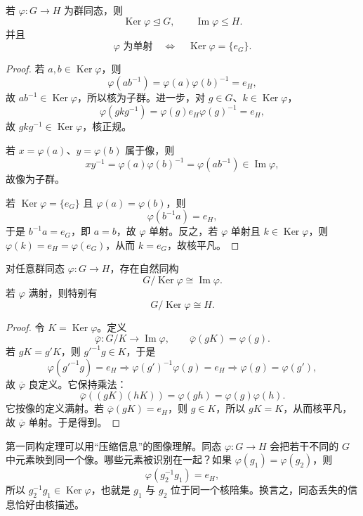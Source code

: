 \begin{theorem}[核与像的结构]
若 $\varphi:G\to H$ 为群同态，则
\[
\operatorname{Ker}\varphi\mathrel{\trianglelefteq} G,
\qquad
\operatorname{Im}\varphi\leqslant H.
\]
并且
\[
\varphi\text{ 为单射}
\quad\Longleftrightarrow\quad
\operatorname{Ker}\varphi=\{e_G\}.
\]
\label{thm:kernel-image}

\end{theorem}

\begin{proof}
若 $a,b\in\operatorname{Ker}\varphi$，则
\[
\varphi(ab^{-1})
=\varphi(a)\varphi(b)^{-1}
=e_H,
\]
故 $ab^{-1}\in\operatorname{Ker}\varphi$，所以核为子群。进一步，对 $g\in G$、$k\in\operatorname{Ker}\varphi$，
\[
\varphi(gkg^{-1})
=\varphi(g)e_H\varphi(g)^{-1}
=e_H,
\]
故 $gkg^{-1}\in\operatorname{Ker}\varphi$，核正规。

若 $x=\varphi(a)$、$y=\varphi(b)$ 属于像，则
\[
xy^{-1}
=\varphi(a)\varphi(b)^{-1}
=\varphi(ab^{-1})\in\operatorname{Im}\varphi,
\]
故像为子群。

若 $\operatorname{Ker}\varphi=\{e_G\}$ 且 $\varphi(a)=\varphi(b)$，则
\[
\varphi(b^{-1}a)=e_H,
\]
于是 $b^{-1}a=e_G$，即 $a=b$，故 $\varphi$ 单射。反之，若 $\varphi$ 单射且 $k\in\operatorname{Ker}\varphi$，则 $\varphi(k)=e_H=\varphi(e_G)$，从而 $k=e_G$，故核平凡。
\end{proof}

\begin{theorem}[第一同构定理]
对任意群同态 $\varphi:G\to H$，存在自然同构
\[
G/\operatorname{Ker}\varphi
\cong
\operatorname{Im}\varphi.
\label{eq:first-isomorphism}
\]
若 $\varphi$ 满射，则特别有
\[
G/\operatorname{Ker}\varphi\cong H.
\]
\label{thm:first-isomorphism}

\end{theorem}

\begin{proof}
令 $K=\operatorname{Ker}\varphi$。定义
\[
\overline{\varphi}:G/K\longrightarrow\operatorname{Im}\varphi,
\qquad
\overline{\varphi}(gK)=\varphi(g).
\]
若 $gK=g'K$，则 $g'^{-1}g\in K$，于是
\[
\varphi(g'^{-1}g)=e_H
\Longrightarrow
\varphi(g')^{-1}\varphi(g)=e_H
\Longrightarrow
\varphi(g)=\varphi(g'),
\]
故 $\overline{\varphi}$ 良定义。它保持乘法：
\[
\overline{\varphi}((gK)(hK))
=\varphi(gh)
=\varphi(g)\varphi(h).
\]
它按像的定义满射。若 $\overline{\varphi}(gK)=e_H$，则 $g\in K$，所以 $gK=K$，从而核平凡，故 $\overline{\varphi}$ 单射。于是得到。
\end{proof}

第一同构定理可以用“压缩信息”的图像理解。同态 $\varphi:G\to H$ 会把若干不同的 $G$ 中元素映到同一个像。哪些元素被识别在一起？如果 $\varphi(g_1)=\varphi(g_2)$，则
\[
\varphi(g_2^{-1}g_1)=e_H,
\]
所以 $g_2^{-1}g_1\in\operatorname{Ker}\varphi$，也就是 $g_1$ 与 $g_2$ 位于同一个核陪集。换言之，同态丢失的信息恰好由核描述。

